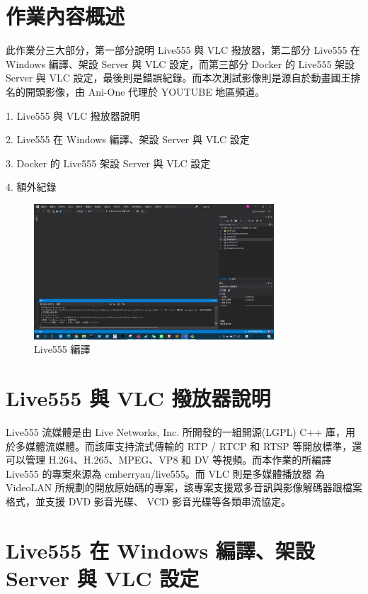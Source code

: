 \documentclass[10pt,UTF8]{ctexart}
\begin{document}
\section{作業內容概述}

此作業分三大部分，第一部分說明 Live555 與 VLC 撥放器，第二部分 Live555 在 Windows 編譯、架設 Server 與 VLC 設定，而第三部分 Docker 的 Live555 架設 Server 與 VLC 設定，最後則是錯誤紀錄。而本次測試影像則是源自於動畫國王排名的開頭影像，由 Ani-One 代理於 YOUTUBE 地區頻道。

1. Live555 與 VLC 撥放器說明

2. Live555 在 Windows 編譯、架設 Server 與 VLC 設定

3. Docker 的 Live555 架設 Server 與 VLC 設定

4. 額外紀錄

\begin{figure}[H]
\centering 
\includegraphics[width=0.80\textwidth]{1.png} 
\caption{Live555 編譯}
\label{Test}
\end{figure}


\section{Live555 與 VLC 撥放器說明}

Live555 流媒體是由 Live Networks, Inc. 所開發的一組開源(LGPL) C++ 庫，用於多媒體流媒體。而該庫支持流式傳輸的 RTP / RTCP 和 RTSP 等開放標準，還可以管理 H.264、H.265、MPEG、VP8 和 DV 等視頻。而本作業的所編譯 Live555 的專案來源為 cmberryau/live555。而 VLC 則是多媒體播放器 為 VideoLAN 所規劃的開放原始碼的專案，該專案支援眾多音訊與影像解碼器跟檔案格式，並支援 DVD 影音光碟、 VCD 影音光碟等各類串流協定。

\section{Live555 在 Windows 編譯、架設 Server 與 VLC 設定}
\end{document}
